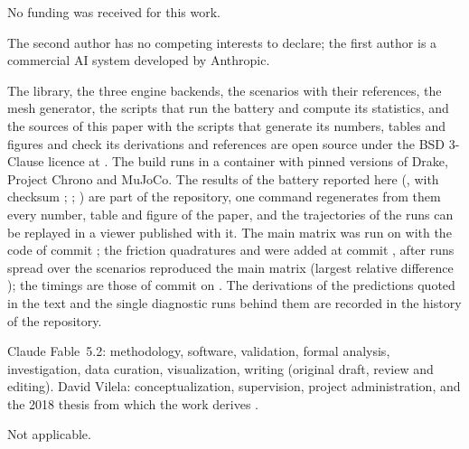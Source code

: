 No funding was received for this work.

The second author has no competing interests to declare; the first author is a commercial AI
system developed by Anthropic.

The library, the three engine backends, the scenarios with their references, the mesh generator,
the scripts that run the battery and compute its statistics, and the sources of this paper with
the scripts that generate its numbers, tables and figures and check its derivations and
references are open source under the BSD 3-Clause licence at
. The
build runs in a container with pinned versions of Drake, Project Chrono and MuJoCo. The results
of the battery reported here (, with checksum ;
; ) are part of the repository, one command regenerates from
them every number, table and figure of the paper, and the trajectories of the runs can be
replayed in a viewer published with it. The main matrix was run on  with
the code of commit ; the friction quadratures and  were added
at commit , after  runs spread over
the scenarios reproduced the main matrix (largest relative difference
); the timings are those of commit  on
. The derivations of the predictions quoted in the text and the
single diagnostic runs behind them are recorded in the history of the repository.

Claude Fable~5.2: methodology, software, validation, formal analysis, investigation, data
curation, visualization, writing (original draft, review and editing). David Vilela:
conceptualization, supervision, project administration, and the 2018 thesis from which the work
derives \cite{Vilela2018}.

Not applicable.
